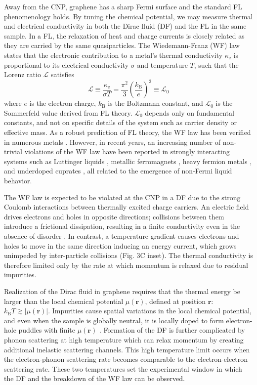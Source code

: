 \documentclass[10pt, oneside]{book}
\begin{document}
\begin{doublespace}
Away from the CNP, graphene has a sharp Fermi surface and the standard FL phenomenology holds. By tuning the chemical potential, we may measure thermal and electrical conductivity in both the Dirac fluid (DF) and the FL in the same sample. In a FL, the relaxation of heat and charge currents is closely related as they are carried by the same quasiparticles. The Wiedemann-Franz (WF) law \cite{ashcroft} states that the electronic contribution to a metal's thermal conductivity $\kappa_{\mathrm{e}}$ is proportional to its electrical conductivity $\sigma$ and temperature $T$, such that the Lorenz ratio $\mathcal{L}$ satisfies
\begin{equation}
\label{WF}
\mathcal{L}\equiv\frac{\kappa_{\mathrm{e}}}{\sigma T}=\frac{\pi^2}{3}\left(\frac{k_{\mathrm{B}}}{e}\right)^2\equiv\mathcal{L}_0
\end{equation}
where $e$ is the electron charge, $k_{\mathrm{B}}$ is the Boltzmann constant, and $\mathcal{L}_0$ is the Sommerfeld value derived from FL theory. $\mathcal{L}_0$ depends only on fundamental constants, and not on specific details of the system such as carrier density or effective mass. As a robust prediction of FL theory, the WF law has been verified in numerous metals \cite{ashcroft}. However, in recent years, an increasing number of non-trivial violations of the WF law have been reported in strongly interacting systems such as Luttinger liquids \cite{wakeham}, metallic ferromagnets \cite{rpsmith}, heavy fermion metals \cite{tanatar}, and underdoped cuprates \cite{Hill:2001gf}, all related to the emergence of non-Fermi liquid behavior.

The WF law is expected to be violated at the CNP in a DF due to the strong Coulomb interactions between thermally excited charge carriers. An electric field drives electrons and holes in opposite directions; collisions between them introduce a frictional dissipation, resulting in a finite conductivity even in the absence of disorder \cite{muller4}. In contrast, a temperature gradient causes electrons and holes to move in the same direction inducing an energy current, which grows unimpeded by inter-particle collisions (Fig. 3C inset). The thermal conductivity is therefore limited only by the rate at which momentum is relaxed due to residual impurities.  

Realization of the Dirac fluid in graphene requires that the thermal energy be larger than the local chemical potential $\mu(\mathbf{r})$, defined at position $\mathbf{r}$: $k_{\mathrm{B}}T\gtrsim |\mu(\mathbf{r})|$. Impurities cause spatial variations in the local chemical potential, and even when the sample is globally neutral, it is locally doped to form electron-hole puddles with finite $\mu(\mathbf{r})$ \cite{sarma1, yacoby2007, crommie, xue}. Formation of the DF is further complicated by phonon scattering at high temperature which can relax momentum by creating additional inelastic scattering channels. This high temperature limit occurs when the electron-phonon scattering rate becomes comparable to the electron-electron scattering rate. These two temperatures set the experimental window in which the DF and the breakdown of the WF law can be observed.


\end{doublespace}
\end{document}
